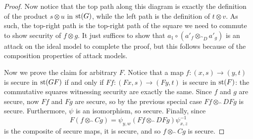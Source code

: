 \begin{proof}
  Now notice that the top path along this diagram is exactly the definition of
  the product $s\otimes u$ in $\operatorname*{st}(G)$, while the left path is the definition
  of $t\otimes v$. As such, the top-right path is the top-right path of the
  square we need to commute to show security of $f\otimes g$. It just suffices
  to show that $a_1\circ (a'_f\otimes_{\cat{D}} a'_g)$ is an attack on the ideal
  model to complete the proof, but this follows because of the composition
  properties of attack models.

  Now we prove the claim for arbitrary $F$. Notice that a map $f: (x, s)\to
  (y, t)$ is secure in $\operatorname*{st}(GF)$ if and only if $Ff: (Fx, s)\to (Fy, t)$ is
  secure in $\operatorname*{st}(F)$: the commutative squares witnessing security are
  exactly the same. Since $f$ and $g$ are secure, now $Ff$ and $Fg$ are secure,
  so by the previous special case $Ff\otimes_\cat{D} Fg$ is secure. Furthermore,
  $\psi$ is an isomorphism, so secure. Finally, since
  \[
    F(f\otimes_\cat{C} g) = \psi_{y,w}(Ff\otimes_\cat{D} Fg)\psi^{-1}_{x,z}
  \] is the composite of secure maps, it is secure, and so $f\otimes_\cat{C} g$
  is secure.

\end{proof}
